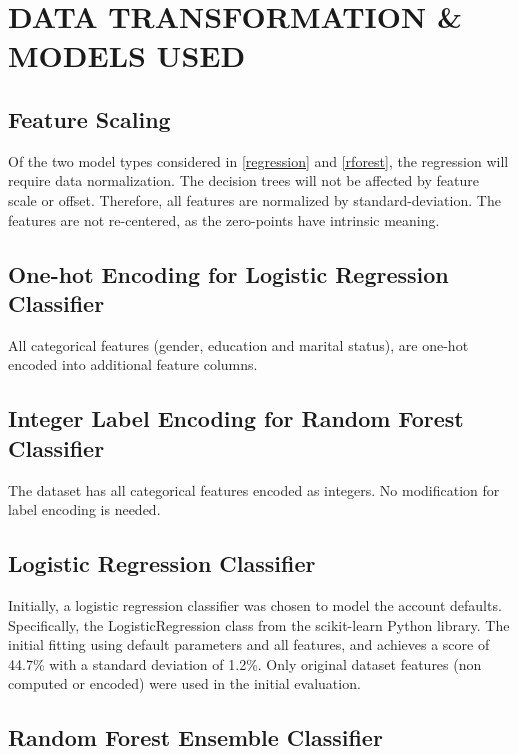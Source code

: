 \documentclass[conference]{IEEEtran}
\begin{document}
\FloatBarrier
\section{DATA TRANSFORMATION \& MODELS USED}

\subsection{Feature Scaling}

Of the two model types considered in \autoref{regression} and
\autoref{rforest}, the regression will require data normalization. The decision
trees will not be affected by feature scale or offset. Therefore, all features
are normalized by standard-deviation. The features are not re-centered, as the
zero-points have intrinsic meaning.

\subsection{One-hot Encoding for Logistic Regression Classifier}

All categorical features (gender, education and marital status), are one-hot
encoded into additional feature columns.

\subsection{Integer Label Encoding for Random Forest Classifier}

The dataset has all categorical features encoded as integers. No modification
for label encoding is needed.

\subsection{Logistic Regression Classifier} \label{regression}

Initially, a logistic regression classifier was chosen to model the account
defaults. Specifically, the LogisticRegression class from the scikit-learn
Python library\cite{sklearn_api}. The initial fitting using default parameters
and all features, and achieves a score of 44.7\% with a standard deviation of
1.2\%. Only original dataset features (non computed or encoded) were used in
the initial evaluation.

\subsection{Random Forest Ensemble Classifier} \label{rforest}
\end{document}
